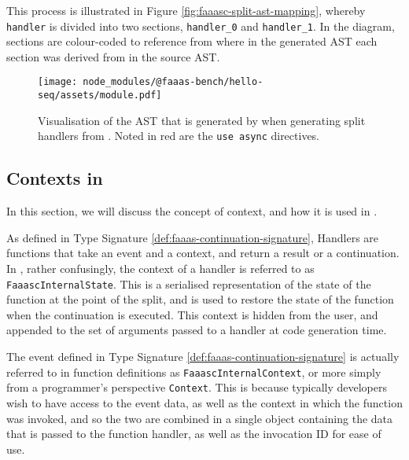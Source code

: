 This process is illustrated in Figure \ref{fig:faaasc-split-ast-mapping}, whereby \verb|handler| is divided into two sections, \verb|handler_0| and \verb|handler_1|. In the diagram, sections are colour-coded to reference from where in the generated AST each section was derived from in the source AST.

\begin{figure*}
    \fontsize{8}{10}\selectfont
    \centering
    
    \caption{Illustration of how an input AST is split into multiple handlers using \texttt{faaasc}. Colours are used to represent which sections of the source AST are output into which sections of the output AST.}
    \label{fig:faaasc-split-ast-mapping}
\end{figure*}

\begin{figure}
    \texttt{[image: node\_modules/@faaas-bench/hello-seq/assets/module.pdf]}
    \caption{Visualisation of the AST that is generated by \faaasc{} when generating split handlers from \js. Noted in red are the \texttt{use async} directives.}
    \label{fig:suites-hello-seq-module-ast}
\end{figure}

\subsection{Contexts in \faaasc{}}
In this section, we will discuss the concept of context, and how it is used in \faaasc{}.

As defined in Type Signature \ref{def:faaas-continuation-signature}, Handlers are functions that take an event and a context, and return a result or a continuation. In \faaasc{}, rather confusingly, the context of a handler is referred to as \verb|FaaascInternalState|. This is a serialised representation of the state of the function at the point of the split, and is used to restore the state of the function when the continuation is executed. This context is hidden from the user, and appended to the set of arguments passed to a handler at code generation time.

The event defined in Type Signature \ref{def:faaas-continuation-signature} is actually referred to in function definitions as \verb|FaaascInternalContext|, or more simply from a programmer's perspective \verb|Context|. This is because typically developers wish to have access to the event data, as well as the context in which the function was invoked, and so the two are combined in a single object containing the data that is passed to the function handler, as well as the invocation ID for ease of use.


